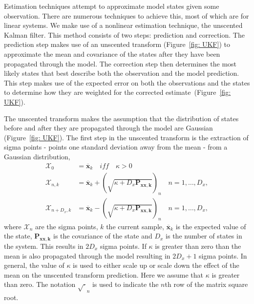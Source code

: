
Estimation techniques attempt to approximate model states given some observation. There are numerous techniques to achieve this, most of which are for linear systems. We make use of a nonlinear estimation technique, the unscented Kalman filter. This method consists of two steps: prediction and correction. The prediction step makes use of an unscented transform (Figure~\ref{fig: UKF}) to approximate the mean and covariance of the states after they have been propagated through the model. The correction step then determines the most likely states that best describe both the observation and the model prediction. This step makes use of the expected error on both the observations and the states to determine how they are weighted for the corrected estimate~(Figure~\ref{fig: UKF}).

The unscented transform makes the assumption that the distribution of states before and after they are propagated through the model are Gaussian (Figure~\ref{fig: UKF}). The first step in the unscented transform is the extraction of sigma points - points one standard deviation away from the mean - from a Gaussian distribution, 
\begin{align}\label{eqn: SigmaP}
\mathbf{\mathcal{X}}_{0} &= \mathbf{\overline{x}}_{k} \quad iff \quad \kappa >0\\
\mathbf{\mathcal{X}}_{n,k} &= \mathbf{\overline{x}}_{k} + (\sqrt{\kappa+D_{x}\mathbf{P_{xx,k}}})_{n} \quad n=1,\hdots,D_x,\\
\mathbf{\mathcal{X}}_{n+D_x,k} &= \mathbf{\overline{x}}_{k} - (\sqrt{\kappa+D_{x}\mathbf{P_{xx,k}}})_{n} \quad n=1,\hdots,D_x,
\end{align} where $\mathbf{\mathcal{X}}_{n}$ are the sigma points, $k$ the current sample, $\mathbf{\overline{x}}_{k}$ is the expected value of the state, $\mathbf{P_{xx,k}}$ is the covariance of the state and $D_{x}$ is the number of states in the system. This results in $2D_{x}$ sigma points. If $\kappa$ is greater than zero than the mean is also propagated through the model resulting in $2D_{x}+1$ sigma points. In general, the value of $\kappa$ is used to either scale up or scale down the effect of the mean on the unscented transform prediction. Here we assume that $\kappa$ is greater than zero. The notation $\sqrt{\cdot}_{n}$ is used to indicate the $n$th row of the matrix square root. 


